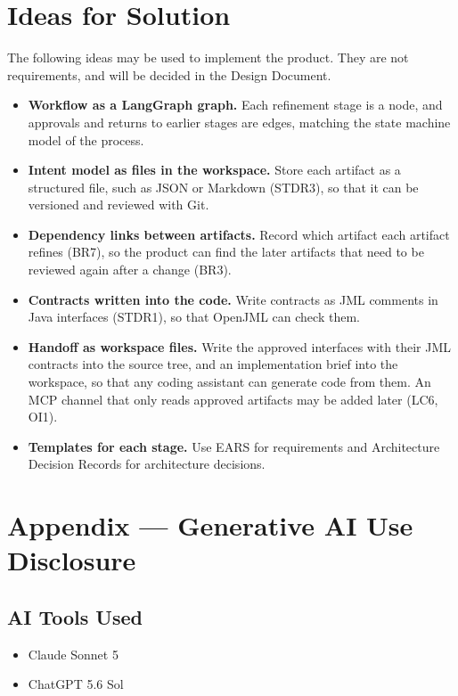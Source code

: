 \documentclass[12pt]{article}
\begin{document}
\section{Ideas for Solution}

The following ideas may be used to implement the product. They are not
requirements, and will be decided in the Design Document.

\begin{itemize}
  \item \textbf{Workflow as a LangGraph graph.} Each refinement stage is a node,
  and approvals and returns to earlier stages are edges, matching the state
  machine model of the process.
  \item \textbf{Intent model as files in the workspace.} Store each artifact as a
  structured file, such as JSON or Markdown (STDR3), so that it can be versioned
  and reviewed with Git.
  \item \textbf{Dependency links between artifacts.} Record which artifact each
  artifact refines (BR7), so the product can find the later artifacts that need
  to be reviewed again after a change (BR3).
  \item \textbf{Contracts written into the code.} Write contracts as JML
  comments in Java interfaces (STDR1), so that OpenJML can check them.
  \item \textbf{Handoff as workspace files.} Write the approved interfaces with
  their JML contracts into the source tree, and an implementation brief into the
  workspace, so that any coding assistant can generate code from them. An
  MCP channel that only reads approved artifacts may be added later (LC6, OI1).
  \item \textbf{Templates for each stage.} Use EARS for requirements and
  Architecture Decision Records for architecture decisions.
\end{itemize}

\newpage{}
\section{Appendix --- Generative AI Use Disclosure}

\subsection{AI Tools Used}

\begin{itemize}
  \item Claude Sonnet 5
  \item ChatGPT 5.6 Sol
\end{itemize}
\end{document}
